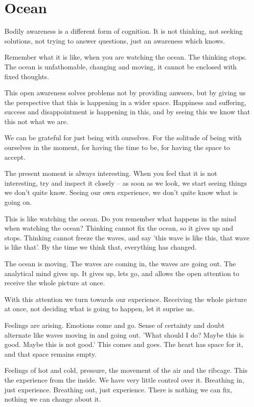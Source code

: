 \hypertarget{ocean-1}{%
\chapter{Ocean}\label{ocean-1}}

Bodily awareness is a different form of cognition. It is not thinking,
not seeking solutions, not trying to answer questions, just an awareness
which knows.

Remember what it is like, when you are watching the ocean. The thinking
stops. The ocean is unfathomable, changing and moving, it cannot be
enclosed with fixed thoughts.

This open awareness solves problems not by providing anwsers, but by
giving us the perspective that this is happening in a wider space.
Happiness and suffering, success and disappointment is happening in
this, and by seeing this we know that this not what we are.

We can be grateful for just being with ourselves. For the solitude of
being with ourselves in the moment, for having the time to be, for
having the space to accept.

The present moment is always interesting. When you feel that it is not
interesting, try and inspect it closely -- as soon as we look, we start
seeing things we don't quite know. Seeing our own experience, we don't
quite know what is going on.

This is like watching the ocean. Do you remember what happens in the
mind when watching the ocean? Thinking cannot fix the ocean, so it gives
up and stops. Thinking cannot freeze the waves, and say 'this wave is
like this, that wave is like that'. By the time we think that,
everything has changed.

The ocean is moving. The waves are coming in, the waves are going out.
The analytical mind gives up. It gives up, lets go, and allows the open
attention to receive the whole picture at once.

With this attention we turn towards our experience. Receiving the whole
picture at once, not deciding what is going to happen, let it suprise
us.

Feelings are arising. Emotions come and go. Sense of certainty and doubt
alternate like waves moving in and going out. 'What should I do? Maybe
this is good. Maybe this is not good.' This comes and goes. The heart
has space for it, and that space remains empty.

Feelings of hot and cold, pressure, the movement of the air and the
ribcage. This the experience from the inside. We have very little
control over it. Breathing in, just experience. Breathing out, just
experience. There is nothing we can fix, nothing we can change about it.

